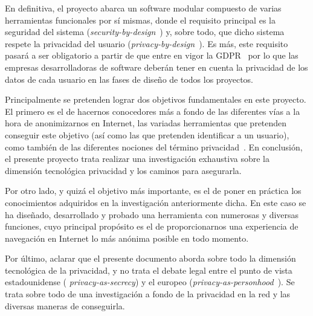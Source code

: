 En definitiva, el proyecto abarca un software modular compuesto de
varias herramientas funcionales por sí mismas, donde el
requisito principal es la seguridad del
sistema (\textit{security-by-design}~\cite{paper:secbydesign}) y, sobre
todo, que dicho sistema respete la privacidad del usuario
(\textit{privacy-by-design}~\cite{paper:privacybydesign,cavoukian2009privacy}). Es
más, este requisito pasará a ser
obligatorio a partir de que entre en vigor la GDPR~\cite{article:PbDGDPR}  por
lo que las empresas desarrolladoras de software deberán tener en
cuenta la privacidad de los datos de cada usuario en las fases de
diseño de todos los proyectos.



Principalmente se pretenden lograr dos objetivos fundamentales en este
proyecto. El primero es el de hacernos conocedores más a fondo de las
diferentes vías a la hora de anonimizarnos en Internet, las variadas
herramientas que pretenden conseguir este objetivo (así como las que
pretenden identificar a un usuario), como también de las
  diferentes nociones del término
privacidad~\cite{article:danezis2010}. En conclusión, el presente
  proyecto trata realizar una investigación exhaustiva sobre la
dimensión tecnológica privacidad y los caminos para
asegurarla.

Por otro lado, y quizá el objetivo más importante, es el de poner en
práctica los conocimientos adquiridos en la investigación
anteriormente dicha. En este caso se ha diseñado, desarrollado y
probado una herramienta con numerosas y diversas funciones, cuyo
principal propósito es el de proporcionarnos una experiencia
  de navegación en Internet lo más
anónima posible en todo momento.

Por último, aclarar que el presente documento aborda sobre todo la dimensión tecnológica de la privacidad, y no trata el debate legal entre el punto de vista estadounidense ( \textit{privacy-as-secrecy}) y el europeo (\textit{privacy-as-personhood}~\cite{solove2002conceptualizing}). Se trata sobre todo de una investigación a fondo de la privacidad en la red y las diversas maneras de conseguirla.





